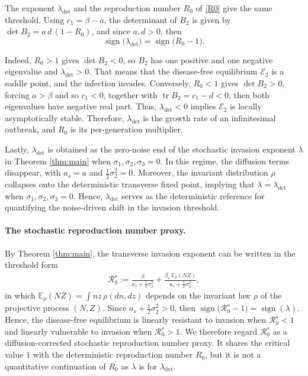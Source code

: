 \documentclass[12pt,a4paper,reqno]{amsart}
\theoremstyle{definition}
\theoremstyle{remark}
\theoremstyle{plain}
\begin{document}
The exponent $\lambda_{\det}$ and the reproduction number $R_0$ of \eqref{R0} give the same threshold. Using $c_1=\beta-a$, the determinant of $B_2$ is given by $\det B_2=a\,d\,(1-R_0)$, and since $a,d>0$, then
\begin{equation}\label{eq:sign-equivalence}
\operatorname{sign}\bigl(\lambda_{\det}\bigr)
=\operatorname{sign}\bigl(R_0-1\bigr).
\end{equation}

Indeed, $R_0>1$ gives $\det B_2<0$, so $B_2$ has one positive and one negative eigenvalue and $\lambda_{\det}>0$. That means that the disease-free equilibrium $\mathcal E_2$ is a saddle point, and the infection invades. Conversely, $R_0<1$ gives $\det B_2>0$, forcing $a>\beta$ and so $c_1<0$, together with $\operatorname{tr}B_2=c_1-d<0$, then both eigenvalues have negative real part. Thus, $\lambda_{\det}<0$ implies $\mathcal E_2$ is locally asymptotically stable. Therefore, $\lambda_{\det}$ is the growth rate of an infinitesimal outbreak, and $R_0$ is its per-generation multiplier. 

Lastly, $\lambda_{\det}$ is obtained as the zero-noise end of the stochastic invasion exponent $\lambda$ in Theorem \ref{thm:main} when $\sigma_1,\sigma_2,\sigma_3= 0$. In this regime, the diffusion terms disappear, with $a_s=a$ and $\frac12\sigma_2^{2}=0$. Moreover, the invariant distribution $\rho$ collapses onto the deterministic transverse fixed point, implying that $\lambda=\lambda_{\det}$ when $\sigma_1,\sigma_2,\sigma_3= 0$. Hence, $\lambda_{\det}$ serves as the deterministic reference for quantifying the noise-driven shift in the invasion threshold.

\paragraph{\textbf{The stochastic reproduction number proxy.}} By Theorem \ref{thm:main}, the transverse invasion exponent can be written in the threshold form
\begin{align}
\mathcal R_0^s:=
\frac{\beta}{a_s+\frac12\sigma_2^2}
+\frac{\beta_e \, \mathbb E_\rho(NZ)}
{a_s+\frac12\sigma_2^2},
\end{align}
in which $\mathbb E_\rho(NZ)=\int nz\,\rho(dn,dz)$ depends on the invariant law $\rho$ of the projective process $(N,Z)$. Since $a_s+\frac12\sigma_2^2>0$, then $\operatorname{sign}\big(\mathcal R_0^s-1\big)=\operatorname{sign}(\lambda)$. Hence, the disease-free equilibrium is linearly resistant to invasion when $\mathcal R_0^s<1$ and linearly vulnerable to invasion when $\mathcal R_0^s>1$. We therefore regard $\mathcal R_0^s$ as a diffusion-corrected stochastic reproduction number proxy. It shares the critical value $1$ with the deterministic reproduction number $R_0$, but it is not a quantitative continuation of $R_0$ as $\lambda$ is for $\lambda_{\det}$.
\end{document}
